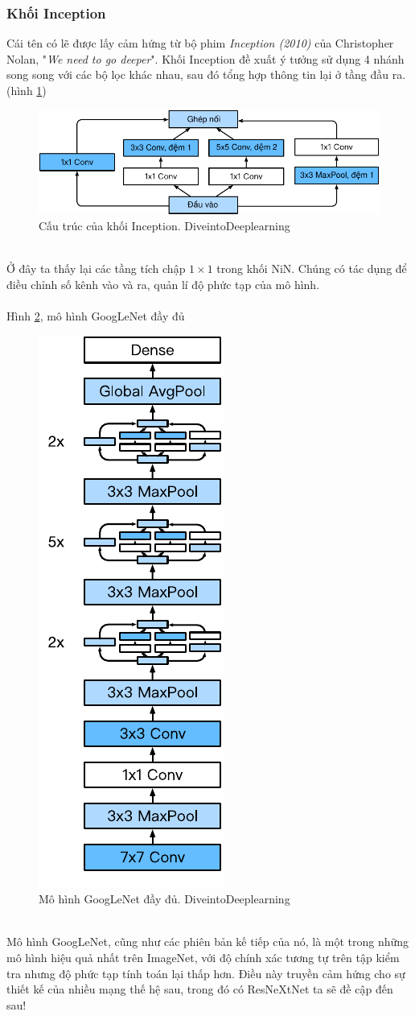 \documentclass{article}
\begin{document}
\subsubsection*{Khối Inception}
Cái tên có lẽ được lấy cảm hứng từ bộ phim \textit{Inception (2010)} của Christopher Nolan, "\textit{We need to go deeper}". Khối Inception đề xuất ý tưởng sử dụng 4 nhánh song song với các bộ lọc khác nhau, sau đó tổng hợp thông tin lại ở tầng đầu ra. (hình \ref{fig12})
\begin{figure}
    \centering
    \includegraphics[width = 0.7\linewidth]{inception_block.pdf}
    \caption{Cấu trúc của khối Inception. DiveintoDeeplearning}
    \label{fig12}
\end{figure}
\phantom{a}\\
Ở đây ta thấy lại các tầng tích chập $1\times 1$ trong khối NiN. Chúng có tác dụng để điều chỉnh số kênh vào và ra, quản lí độ phức tạp của mô hình.
\\\\
Hình \ref{fig13}, mô hình GoogLeNet đầy đủ
\begin{figure}
    \centering
    \includegraphics[width = 0.25\linewidth]{inception-full.pdf}
    \caption{Mô hình GoogLeNet đầy đủ. DiveintoDeeplearning}
    \label{fig13}
\end{figure}
\phantom{a}\\
Mô hình GoogLeNet, cũng như các phiên bản kế tiếp của nó, là một trong những mô hình hiệu quả nhất trên ImageNet, với độ chính xác tương tự trên tập kiểm tra nhưng độ phức tạp tính toán lại thấp hơn. Điều này truyền cảm hứng cho sự thiết kế của nhiều mạng thế hệ sau, trong đó có ResNeXtNet ta sẽ đề cập đến sau!
\end{document}
